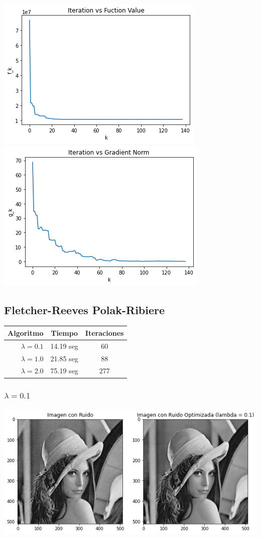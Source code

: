 \documentclass[11pt,letterpaper]{article}
\theoremstyle{definition}
\theoremstyle{definition}
\theoremstyle{definition}
\begin{document}
\begin{center}
	\includegraphics[width=0.6\linewidth]{graficas/hs/funcion_2}
	\includegraphics[width=0.6\linewidth]{graficas/hs/gradiente_2}
\end{center}

\subsection{Fletcher-Reeves Polak-Ribiere}
\begin{center}
	\begin{tabular}{rcc}
		\hline
		\hline
		Algoritmo          & Tiempo       & Iteraciones \\
		\hline
		\hline
		$ \lambda = 0.1 $ & 14.19 seg &    60         \\
		$ \lambda = 1.0 $ & 21.85 seg &    88          \\
		$ \lambda = 2.0 $ & 75.19 seg &    277          \\
		\hline
	\end{tabular}
\end{center}
\subsubsection{$ \lambda = 0.1 $}
\begin{center}
	\includegraphics[width=0.75\linewidth]{graficas/frpr/optimizada_0}
\end{center}
\end{document}
